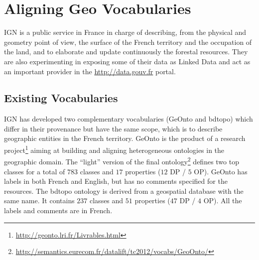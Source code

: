 \documentclass[a4paper,11pt]{report}
\begin{document}

\section{Aligning Geo Vocabularies}                                         \label{sec:alignment}
IGN is a public service in France in charge of describing, from the physical and geometry point of view, the surface of the French territory and the occupation of the land, and to elaborate and update continuously the forestal resources. They are also experimenting in exposing some of their data as Linked Data and act as an important provider in the \url{http://data.gouv.fr} portal.

\subsection{Existing Vocabularies}
IGN has developed two complementary vocabularies (GeOnto and bdtopo) which differ in their provenance but have the same scope, which is to describe geographic entities in the French territory. GeOnto is the product of a research project\footnote{\url{http://geonto.lri.fr/Livrables.html}} aiming at building and aligning heterogeneous ontologies in the geographic domain. The ``light'' version of the final ontology\footnote{\url{http://semantics.eurecom.fr/datalift/tc2012/vocabs/GeoOnto/}} defines two top classes for a total of $783$ classes and $17$ properties ($12$ DP / $5$ OP). GeOnto has labels in both French and English, but has no comments specified for the resources. The bdtopo ontology is derived from a geospatial database with the same name. It contains $237$ classes and $51$ properties ($47$ DP / $4$ OP). All the labels and comments are in French.
\end{document}
